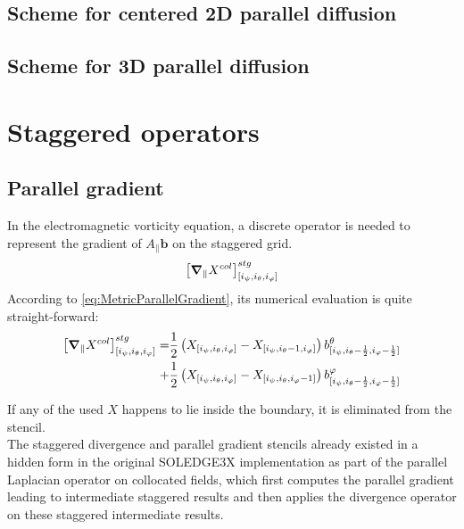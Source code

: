\subsection{Scheme for centered 2D parallel diffusion}


\subsection{Scheme for 3D parallel diffusion}




\section{Staggered operators}



\subsection{Parallel gradient}

In the electromagnetic vorticity equation, a discrete operator is needed to represent the gradient of $A_\parallel \mathbf{b}$ on the staggered grid.
$$\left[\grad_\parallel X^{col}\right]^{stg}_{[i_\psi,i_\theta, i_\varphi]}$$
According to \autoref{eq:MetricParallelGradient}, its numerical evaluation is quite straight-forward: 
\begin{align}
	\label{eq:NumericalStaggeredParallelGradientStencil}
	\left[\grad_\parallel X^{col}\right]^{stg}_{[i_\psi,i_\theta, i_\varphi]} =& \frac{1}{2}\left(X_{[i_\psi,i_\theta, i_\varphi]}-X_{[i_\psi,i_\theta-1, i_\varphi]}\right)b_{[i_\psi,i_\theta-\frac{1}{2}, i_\varphi-\frac{1}{2}]}^\theta \nonumber \\ +& 
	\frac{1}{2}\left(X_{[i_\psi,i_\theta, i_\varphi]}-X_{[i_\psi,i_\theta, i_\varphi-1]}\right)b_{[i_\psi,i_\theta-\frac{1}{2}, i_\varphi-\frac{1}{2}]}^\varphi
\end{align}

If any of the used $X$ happens to lie inside the boundary, it is eliminated from the stencil. \\

The staggered divergence and parallel gradient stencils already existed in a hidden form in the original SOLEDGE3X implementation as part of the parallel Laplacian operator on collocated fields, which first computes the parallel gradient leading to intermediate staggered results and then applies the divergence operator on these staggered intermediate results.


